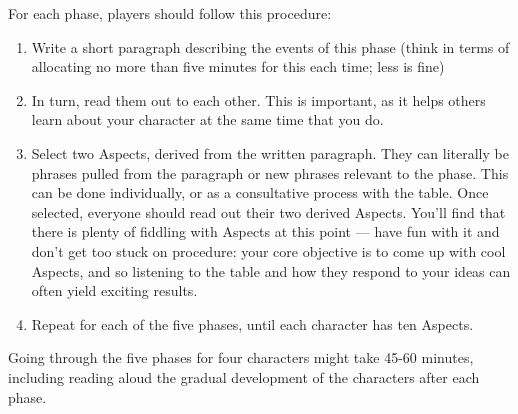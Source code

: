 For each phase, players should follow this procedure:
\begin{enumerate}
\item Write a short paragraph describing the events of this phase (think in terms of allocating no more than five minutes for this each time; less is fine)

\item In turn, read them out to each other. This is important, as it helps others learn about your character at the same time that you do.

\item Select two Aspects, derived from the written paragraph. They can literally be phrases pulled from the paragraph or new phrases relevant to the phase. This can be done individually, or as a consultative process with the table. Once selected, everyone should read out their two derived Aspects. You'll find that there is plenty of fiddling with Aspects at this point --- have fun with it and don't get too stuck on procedure: your core objective is to come up with cool Aspects, and so listening to the table and how they respond to your ideas can often yield exciting results.

\item Repeat for each of the five phases, until each character has ten Aspects.
\end{enumerate}

Going through the five phases for four characters might take 45-60 minutes, including reading aloud the gradual development of the characters after each phase.


